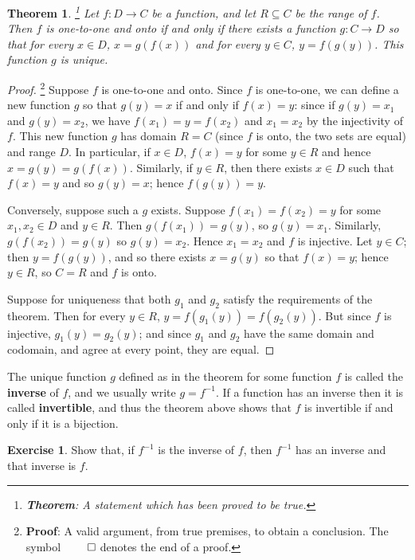 \documentclass[a4paper,leqno]{article}
\numberwithin{equation}{section}
\newtheorem{thm}[equation]{Theorem}
\theoremstyle{definition}
\newtheorem{exercise}[equation]{Exercise}
\theoremstyle{remark}
\newcommand{\df}[1]{\textbf{#1}}
\begin{document}
\begin{thm}\footnote{\df{Theorem}: A statement which has been proved to be true.}
  Let $ f : D \to C $ be a function, and let $ R \subseteq C $ be the range of $ f $. Then $ f $ is one-to-one and onto if and only if there exists a
  function $ g : C \to D $ so that for every $ x \in D $, $ x = g(f(x)) $ and for every $ y \in C $, $ y = f(g(y)) $. This function $ g $ is unique.
\end{thm}
\begin{proof}\footnote{\df{Proof}: A valid argument, from true premises, to obtain a conclusion. The symbol $ \qed $ denotes the end of a proof.}
  Suppose $ f $ is one-to-one and onto. Since $ f $ is one-to-one, we can define a new function $ g $ so that $ g(y) = x $ if and only if $ f(x) = y $:
  since if $ g(y) = x_1 $ and $ g(y) = x_2 $, we have $ f(x_1) = y = f(x_2) $ and $ x_1 = x_2 $ by the injectivity of $ f $. This new function $ g $
  has domain $ R = C $ (since $ f $ is onto, the two sets are equal) and range $ D $. In particular, if $ x \in D $, $ f(x) = y $ for some $ y \in R $
  and hence $ x = g(y) = g(f(x)) $. Similarly, if $ y \in R $, then there exists $ x \in D $ such that $ f(x) = y $ and so $ g(y) = x $; hence $ f(g(y)) = y $.

  Conversely, suppose such a $ g $ exists. Suppose $ f(x_1) = f(x_2) = y $ for some $ x_1, x_2 \in D $ and $ y \in R $. Then $ g(f(x_1)) = g(y) $, so $ g(y) = x_1 $.
  Similarly, $ g(f(x_2)) = g(y) $ so $ g(y) = x_2 $. Hence $ x_1 = x_2 $ and $ f $ is injective. Let $ y \in C $; then $ y = f(g(y)) $, and so there
  exists $ x = g(y) $ so that $ f(x) = y $; hence $ y \in R $, so $ C = R $ and $ f $ is onto.

  Suppose for uniqueness that both $ g_1 $ and $ g_2 $ satisfy the requirements of the theorem. Then for every $ y \in R $,  $ y = f(g_1(y)) = f(g_2(y)) $. But
  since $ f $ is injective, $ g_1(y) = g_2(y) $; and since $ g_1 $ and $ g_2 $ have the same domain and codomain, and agree at every point, they are equal.
\end{proof}

The unique function $ g $ defined as in the theorem for some function $ f $ is called the \df{inverse} of $ f $, and we usually write $ g = f^{-1} $. If
a function has an inverse then it is called \df{invertible}, and thus the theorem above shows that $ f $ is invertible if and only if it is a bijection.

\begin{exercise}
  Show that, if $ f^{-1} $ is the inverse of $ f $, then $ f^{-1} $ has an inverse and that inverse is $ f $.
\end{exercise}
\end{document}
